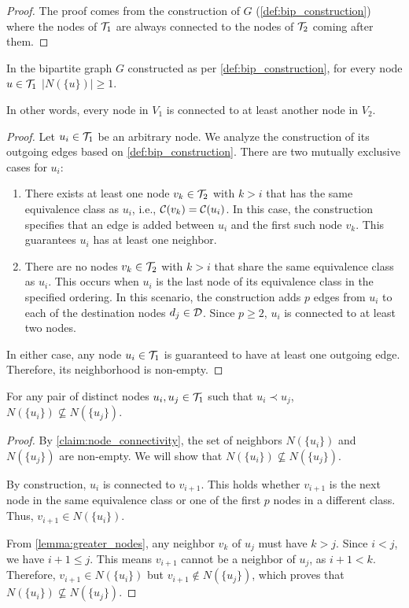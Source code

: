 \begin{proof}
    The proof comes from the construction of $G$ (\cref{def:bip_construction}) where the nodes of $\mathcal{T}_{1}$ are always connected to the nodes of $\mathcal{T}_{2}$ coming after them.
\end{proof}

\begin{lemma} \label{claim:node_connectivity}
    In the bipartite graph $G$ constructed as per \cref{def:bip_construction}, for every node $u \in \mathcal{T}_{1}$ $|N(\{u\})| \geq 1$.
\end{lemma}
In other words, every node in $V_1$ is connected to at least another node in $V_2$.
\begin{proof}
    Let $u_i \in \mathcal{T}_{1}$ be an arbitrary node. We analyze the construction of its outgoing edges based on \cref{def:bip_construction}. There are two mutually exclusive cases for $u_i$:
    \begin{enumerate}[leftmargin=25pt]
        \item There exists at least one node $v_k \in \mathcal{T}_{2}$ with $k > i$ that has the same equivalence class as $u_i$, i.e., $\mathcal{C}(v_k) = \mathcal{C}(u_i)$. In this case, the construction specifies that an edge is added between $u_i$ and the first such node $v_k$. This guarantees $u_i$ has at least one neighbor.
        \item There are no nodes $v_k \in \mathcal{T}_{2}$ with $k > i$ that share the same equivalence class as $u_i$. This occurs when $u_i$ is the last node of its equivalence class in the specified ordering. In this scenario, the construction adds $p$ edges from $u_i$ to each of the destination nodes $d_j \in \mathcal{D}$. Since $p \geq 2$, $u_i$ is connected to at least two nodes.
    \end{enumerate}
    In either case, any node $u_i \in \mathcal{T}_{1}$ is guaranteed to have at least one outgoing edge. Therefore, its neighborhood is non-empty.
\end{proof}

\begin{lemma} \label{lemma:distinct_neighborhoods}
    For any pair of distinct nodes $u_i, u_j \in \mathcal{T}_{1}$ such that $u_i \prec u_j$, $N(\{u_i\}) \not\subseteq N(\{u_j\})$.
\end{lemma}
\begin{proof}
    By \cref{claim:node_connectivity}, the set of neighbors $N(\{u_i\})$ and $N(\{u_j\})$ are non-empty. We will show that $N(\{u_i\}) \not\subseteq N(\{u_j\})$. 
    
    By construction, $u_i$ is connected to $v_{i+1}$. This holds whether $v_{i+1}$ is the next node in the same equivalence class or one of the first $p$ nodes in a different class. Thus, $v_{i+1} \in N(\{u_i\})$.

    From \cref{lemma:greater_nodes}, any neighbor $v_k$ of $u_j$ must have $k > j$. Since $i < j$, we have $i+1 \leq j$.
    This means $v_{i+1}$ cannot be a neighbor of $u_j$, as $i + 1 < k$. Therefore, $v_{i+1} \in N(\{u_i\})$ but $v_{i+1} \notin N(\{u_j\})$, which proves that $N(\{u_i\}) \not\subseteq N(\{u_j\})$.
\end{proof}

